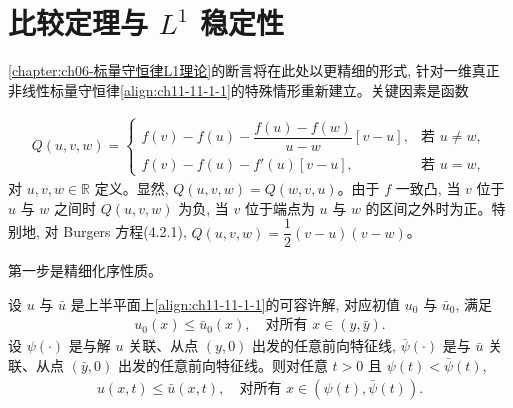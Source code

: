 \documentclass[../../main.tex]{subfiles}
\begin{document}
\section{比较定理与 $L^1$ 稳定性}\label{section:ch11-比较定理与L1稳定性}

\cref{chapter:ch06-标量守恒律L1理论}的断言将在此处以更精细的形式, 针对一维真正非线性标量守恒律\eqref{align:ch11-11-1-1}的特殊情形重新建立。关键因素是函数

\begin{align}
Q(u,v,w)=
\begin{cases}
f(v)-f(u)-\dfrac{f(u)-f(w)}{u-w}[v-u], & \text{若 }u\neq w,\\[3mm]
f(v)-f(u)-f'(u)[v-u], & \text{若 }u=w,
\end{cases}\label{align:ch11-11-8-1}
\end{align}
对 $u,v,w\in\mathbb{R}$ 定义。显然, $Q(u,v,w)=Q(w,v,u)$。由于 $f$ 一致凸, 当 $v$ 位于 $u$ 与 $w$ 之间时 $Q(u,v,w)$ 为负, 当 $v$ 位于端点为 $u$ 与 $w$ 的区间之外时为正。特别地, 对 Burgers 方程(4.2.1), $Q(u,v,w)=\dfrac12(v-u)(v-w)$。

第一步是精细化序性质。

\begin{theorem}\label{theorem:ch11-11-8-1}
设 $u$ 与 $\bar u$ 是上半平面上\eqref{align:ch11-11-1-1}的可容许解, 对应初值 $u_0$ 与 $\bar u_0$, 满足
\begin{align}
u_0(x)\leqslant\bar u_0(x),\quad \text{对所有 }x\in(y,\bar y).\label{align:ch11-11-8-2}
\end{align}
设 $\psi(\cdot)$ 是与解 $u$ 关联、从点 $(y,0)$ 出发的任意前向特征线, $\bar\psi(\cdot)$ 是与 $\bar u$ 关联、从点 $(\bar y,0)$ 出发的任意前向特征线。则对任意 $t>0$ 且 $\psi(t)<\bar\psi(t)$,
\begin{align}
u(x,t)\leqslant\bar u(x,t),\quad \text{对所有 }x\in(\psi(t),\bar\psi(t)).\label{align:ch11-11-8-3}
\end{align}
\end{theorem}
\end{document}
